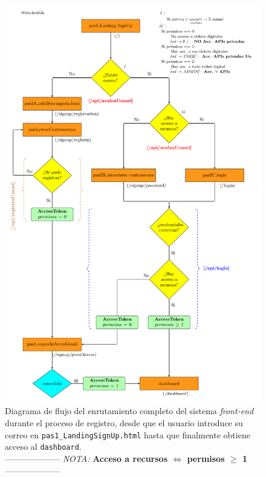 \documentclass[a4paper,12pt]{report}
\begin{document}
	
	\setlength{\belowcaptionskip}{3pt}
	\FloatBarrier
	\begin{figure}[H]
		\centering
		\caption{Diagrama de flujo del enrutamiento completo del sistema \textit{front-end} durante el proceso de registro, desde que el usuario introduce su correo en \texttt{pas1\_LandingSignUp.html} hasta que finalmente obtiene acceso al \texttt{dashboard}.\\ -------------------- \textit{NOTA:} \textbf{Acceso a recursos $\iff$ permisos $\geq$ 1} --------------------}
		\includegraphics[width=1\textwidth]{img/diagramaMercAppFront.pdf}
		
		\label{fig:diagramaMercaAppFront} 
	\end{figure}
	\FloatBarrier
	
\end{document}
